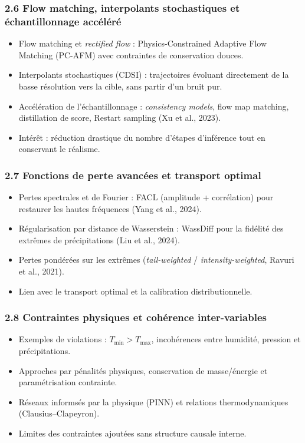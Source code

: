 \documentclass[12pt,a4paper]{article}
\begin{document}
\subsubsection*{2.6 Flow matching, interpolants stochastiques et \'echantillonnage acc\'el\'er\'e}
\begin{itemize}
    \item Flow matching et \emph{rectified flow} : Physics-Constrained Adaptive Flow Matching (PC-AFM) avec contraintes de conservation douces.
    \item Interpolants stochastiques (CDSI) : trajectoires \'evoluant directement de la basse r\'esolution vers la cible, sans partir d'un bruit pur.
    \item Acc\'el\'eration de l'\'echantillonnage : \emph{consistency models}, flow map matching, distillation de score, Restart sampling (Xu et al., 2023).
    \item Int\'er\^et : r\'eduction drastique du nombre d'\'etapes d'inf\'erence tout en conservant le r\'ealisme.
\end{itemize}

\subsubsection*{2.7 Fonctions de perte avanc\'ees et transport optimal}
\begin{itemize}
    \item Pertes spectrales et de Fourier : FACL (amplitude + corr\'elation) pour restaurer les hautes fr\'equences (Yang et al., 2024).
    \item R\'egularisation par distance de Wasserstein : WassDiff pour la fid\'elit\'e des extr\^emes de pr\'ecipitations (Liu et al., 2024).
    \item Pertes pond\'er\'ees sur les extr\^emes (\emph{tail-weighted} / \emph{intensity-weighted}, Ravuri et al., 2021).
    \item Lien avec le transport optimal et la calibration distributionnelle.
\end{itemize}

\subsubsection*{2.8 Contraintes physiques et coh\'erence inter-variables}
\begin{itemize}
    \item Exemples de violations : $T_{\min} > T_{\max}$, incoh\'erences entre humidit\'e, pression et pr\'ecipitations.
    \item Approches par p\'enalit\'es physiques, conservation de masse/\'energie et param\'etrisation contrainte.
    \item R\'eseaux informs\'es par la physique (PINN) et relations thermodynamiques (Clausius--Clapeyron).
    \item Limites des contraintes ajout\'ees sans structure causale interne.
\end{itemize}
\end{document}
